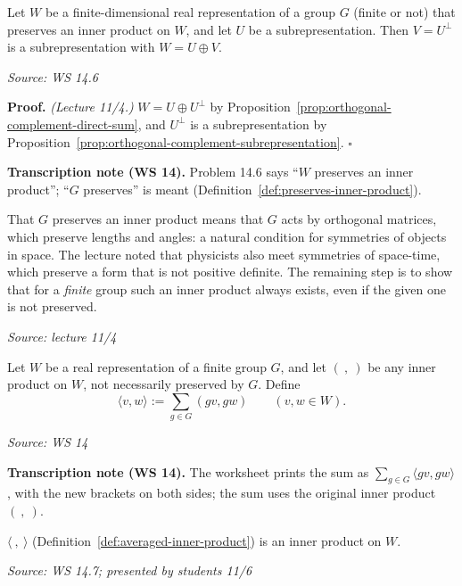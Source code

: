 \documentclass[11pt]{report}
\renewenvironment{proof}[1][Proof]{\noindent\textbf{#1.} }{\hfill$\square$\par\vspace{5pt}}
\newcommand{\srcline}[1]{\par\hfill{\footnotesize\textit{Source: #1}}}
\begin{document}
\begin{corbox}\label{cor:maschke-preserved-inner-product}
Let $W$ be a finite-dimensional real representation of a group $G$ (finite or not) that preserves an inner product on $W$, and let $U$ be a subrepresentation. Then $V = U^\perp$ is a subrepresentation with $W = U \oplus V$.
\srcline{WS 14.6}
\end{corbox}

\begin{proof}
\textit{(Lecture 11/4.)} $W = U \oplus U^\perp$ by Proposition~\ref{prop:orthogonal-complement-direct-sum}, and $U^\perp$ is a subrepresentation by Proposition~\ref{prop:orthogonal-complement-subrepresentation}.
\end{proof}

\textbf{Transcription note (WS 14).} Problem 14.6 says ``$W$ preserves an inner product''; ``$G$ preserves'' is meant (Definition~\ref{def:preserves-inner-product}).

\begin{rembox}\label{rem:maschke-physical-meaning}
That $G$ preserves an inner product means that $G$ acts by orthogonal matrices, which preserve lengths and angles: a natural condition for symmetries of objects in space. The lecture noted that physicists also meet symmetries of space-time, which preserve a form that is not positive definite. The remaining step is to show that for a \emph{finite} group such an inner product always exists, even if the given one is not preserved.
\srcline{lecture 11/4}
\end{rembox}

\begin{defbox}\label{def:averaged-inner-product}
Let $W$ be a real representation of a finite group $G$, and let $(\ ,\ )$ be any inner product on $W$, not necessarily preserved by $G$. Define
\[ \langle v, w \rangle := \sum_{g \in G} (gv, gw) \qquad (v, w \in W). \]
\srcline{WS 14}
\end{defbox}

\textbf{Transcription note (WS 14).} The worksheet prints the sum as $\sum_{g \in G} \langle gv, gw \rangle$, with the new brackets on both sides; the sum uses the original inner product $(\ ,\ )$.

\begin{propbox}\label{prop:averaged-inner-product}
$\langle\ ,\ \rangle$ (Definition~\ref{def:averaged-inner-product}) is an inner product on $W$.
\srcline{WS 14.7; presented by students 11/6}
\end{propbox}
\end{document}
